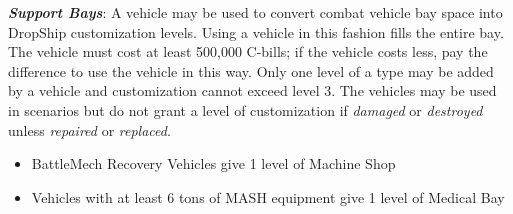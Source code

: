 \emph{\bfseries Support Bays}: A vehicle may be used to convert combat vehicle bay space into DropShip customization levels.
Using a vehicle in this fashion fills the entire bay.
The vehicle must cost at least 500,000 C-bills; if the vehicle costs less, pay the difference to use the vehicle in this way.
Only one level of a type may be added by a vehicle and customization cannot exceed level 3.
The vehicles may be used in scenarios but do not grant a level of customization if \emph{damaged} or \emph{destroyed} unless \emph{repaired} or \emph{replaced}.

\begin{itemize}

\item BattleMech Recovery Vehicles give 1 level of Machine Shop

\item Vehicles with at least 6 tons of MASH equipment give 1 level of Medical Bay

\end{itemize}
